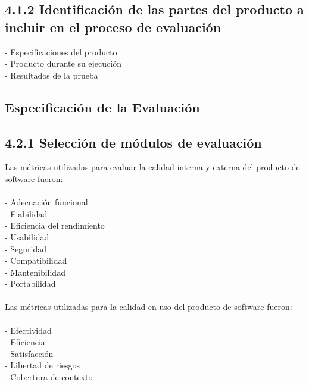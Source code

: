 \documentclass[https://www.overleaf.com/project/63761df255a8a9f4a15c3579
	letterpaper, %
	10pt, %
]{CSUniSchoolLabReport}
\begin{document}
            \subsection*{4.1.2 \hspace{0.5em} Identificación de las partes del producto a incluir en el proceso de evaluación}
                - Especificaciones del producto
                \\
                - Producto durante su ejecución
                \\
                - Resultados de la prueba

        \subsection{Especificación de la Evaluación}
            \subsection*{4.2.1 \hspace{0.5em} Selección de módulos de evaluación}
                Las métricas utilizadas para evaluar la calidad interna y externa del producto de software fueron: 
                \\\\
                - Adecuación funcional
                \\
                - Fiabilidad
                \\
                - Eficiencia del rendimiento
                \\
                - Usabilidad
                \\
                - Seguridad
                \\
                - Compatibilidad
                \\
                - Mantenibilidad
                \\
                - Portabilidad
                \\\\
                Las métricas utilizadas para la calidad en uso del producto de software fueron:
                \\\\
                - Efectividad
                \\
                - Eficiencia
                \\
                - Satisfacción
                \\
                - Libertad de riesgos
                \\
                - Cobertura de contexto
            
\end{document}
